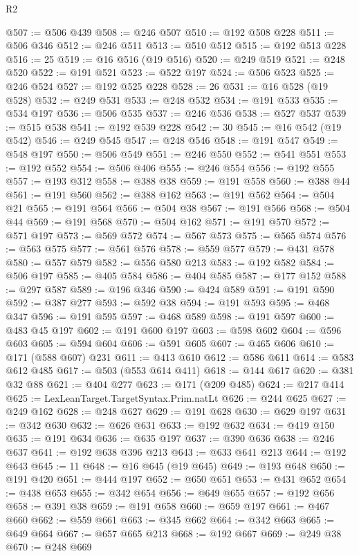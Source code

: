 \begin{lexlean}{R2}
\begin{coremodule}
@507 := @506 @439
@508 := @246 @507
@510 := @192 @508 @228
@511 := @506 @346
@512 := @246 @511
@513 := @510 @512
@515 := @192 @513 @228
@516 := 25
@519 := @16 @516 (@19 @516)
@520 := @249 @519
@521 := @248 @520
@522 := @191 @521
@523 := @522 @197
@524 := @506 @523
@525 := @246 @524
@527 := @192 @525 @228
@528 := 26
@531 := @16 @528 (@19 @528)
@532 := @249 @531
@533 := @248 @532
@534 := @191 @533
@535 := @534 @197
@536 := @506 @535
@537 := @246 @536
@538 := @527 @537
@539 := @515 @538
@541 := @192 @539 @228
@542 := 30
@545 := @16 @542 (@19 @542)
@546 := @249 @545
@547 := @248 @546
@548 := @191 @547
@549 := @548 @197
@550 := @506 @549
@551 := @246 @550
@552 := @541 @551
@553 := @192 @552
@554 := @506 @406
@555 := @246 @554
@556 := @192 @555
@557 := @193 @312
@558 := @388 @38
@559 := @191 @558
@560 := @388 @44
@561 := @191 @560
@562 := @388 @162
@563 := @191 @562
@564 := @504 @21
@565 := @191 @564
@566 := @504 @38
@567 := @191 @566
@568 := @504 @44
@569 := @191 @568
@570 := @504 @162
@571 := @191 @570
@572 := @571 @197
@573 := @569 @572
@574 := @567 @573
@575 := @565 @574
@576 := @563 @575
@577 := @561 @576
@578 := @559 @577
@579 := @431 @578
@580 := @557 @579
@582 := @556 @580 @213
@583 := @192 @582
@584 := @506 @197
@585 := @405 @584
@586 := @404 @585
@587 := @177 @152
@588 := @297 @587
@589 := @196 @346
@590 := @424 @589
@591 := @191 @590
@592 := @387 @277
@593 := @592 @38
@594 := @191 @593
@595 := @468 @347
@596 := @191 @595
@597 := @468 @589
@598 := @191 @597
@600 := @483 @45 @197
@602 := @191 @600 @197
@603 := @598 @602
@604 := @596 @603
@605 := @594 @604
@606 := @591 @605
@607 := @465 @606
@610 := @171 (@588 @607) @231
@611 := @413 @610
@612 := @586 @611
@614 := @583 @612 @485
@617 := @503 (@553 @614 @411)
@618 := @144 @617
@620 := @381 @32 @88
@621 := @404 @277
@623 := @171 (@209 @485)
@624 := @217 @414
@625 := LexLeanTarget.TargetSyntax.Prim.natLt
@626 := @244 @625
@627 := @249 @162
@628 := @248 @627
@629 := @191 @628
@630 := @629 @197
@631 := @342 @630
@632 := @626 @631
@633 := @192 @632
@634 := @419 @150
@635 := @191 @634
@636 := @635 @197
@637 := @390 @636
@638 := @246 @637
@641 := @192 @638 @396 @213
@643 := @633 @641 @213
@644 := @192 @643
@645 := 11
@648 := @16 @645 (@19 @645)
@649 := @193 @648
@650 := @191 @420
@651 := @444 @197
@652 := @650 @651
@653 := @431 @652
@654 := @438 @653
@655 := @342 @654
@656 := @649 @655
@657 := @192 @656
@658 := @391 @38
@659 := @191 @658
@660 := @659 @197
@661 := @467 @660
@662 := @559 @661
@663 := @345 @662
@664 := @342 @663
@665 := @649 @664
@667 := @657 @665 @213
@668 := @192 @667
@669 := @249 @38
@670 := @248 @669

\end{coremodule}
\end{lexlean}
